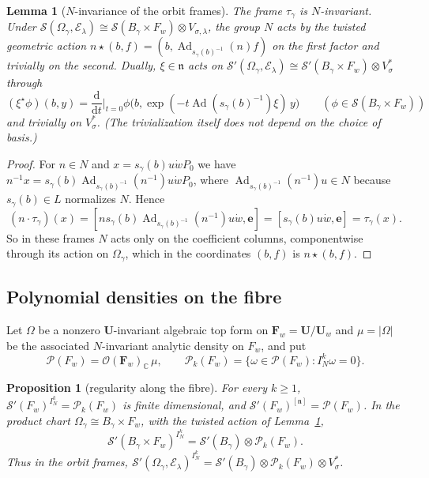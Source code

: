 \documentclass[a4paper,12pt]{amsart}
\numberwithin{equation}{section}
\newtheorem{proposition}[theorem]{Proposition}
\newtheorem{lemma}[theorem]{Lemma}
\theoremstyle{definition}
\theoremstyle{remark}
\newcommand{\U}{\mathbf U}
\newcommand{\F}{\mathbf F}
\newcommand{\C}{\mathbb C}
\newcommand{\fn}{\mathfrak n}
\newcommand{\IN}{I_N}
\newcommand{\mcS}{\mathcal S}
\newcommand{\mcE}{\mathcal E}
\newcommand{\mcP}{\mathcal P}
\newcommand{\Ad}{\operatorname{Ad}}
\newcommand{\dd}{\mathrm d}
\begin{document}
\begin{lemma}[$N$-invariance of the orbit frames]\label{lem:tau-invariant}
The frame $\tau_\gamma$ is $N$-invariant. Under $\mcS(\Omega_\gamma,\mcE_\lambda)\cong\mcS(B_\gamma\times F_w)\otimes V_{\sigma,\lambda}$, the group $N$ acts by the twisted geometric action $n\star(b,f)=(b,\Ad_{s_\gamma(b)^{-1}}(n)f)$ on the first factor and trivially on the second. Dually, $\xi\in\fn$ acts on $\mcS'(\Omega_\gamma,\mcE_\lambda)\cong\mcS'(B_\gamma\times F_w)\otimes V_\sigma^*$ through
\[
 (\xi^\star\phi)(b,y)=\frac{\dd}{\dd t}\Big|_{t=0}\phi\bigl(b,\exp(-t\Ad(s_\gamma(b)^{-1})\xi)\,y\bigr)\qquad(\phi\in\mcS(B_\gamma\times F_w))
\]
and trivially on $V_\sigma^*$. (The trivialization itself does not depend on the choice of basis.)
\end{lemma}

\begin{proof}
For $n\in N$ and $x=s_\gamma(b)u\dot wP_0$ we have $n^{-1}x=s_\gamma(b)\Ad_{s_\gamma(b)^{-1}}(n^{-1})u\dot wP_0$, where $\Ad_{s_\gamma(b)^{-1}}(n^{-1})u\in N$ because $s_\gamma(b)\in L$ normalizes $N$. Hence
\[
 (n\cdot\tau_\gamma)(x)=[ns_\gamma(b)\Ad_{s_\gamma(b)^{-1}}(n^{-1})u\dot w,\mathbf e]
 =[s_\gamma(b)u\dot w,\mathbf e]=\tau_\gamma(x).
\]
So in these frames $N$ acts only on the coefficient columns, componentwise through its action on $\Omega_\gamma$, which in the coordinates $(b,f)$ is $n\star(b,f)$.
\end{proof}

\subsection{Polynomial densities on the fibre}\label{ssec:poly-densities}

Let $\Omega$ be a nonzero $\U$-invariant algebraic top form on $\F_w=\U/\U_w$ and $\mu=|\Omega|$ be the associated $N$-invariant analytic density on $F_w$, and put
\[
 \mcP(F_w)=\mathcal O(\F_w)_\C\,\mu,\qquad\mcP_k(F_w)=\{\omega\in\mcP(F_w):\IN^k\omega=0\}.
\]

\begin{proposition}[regularity along the fibre]\label{prop:poly-densities}
For every $k\ge1$, $\mcS'(F_w)^{\IN^k}=\mcP_k(F_w)$ is finite dimensional,
and $\mcS'(F_w)^{[\fn]}=\mcP(F_w)$. In the product chart $\Omega_\gamma\cong B_\gamma\times F_w$, with the twisted action of Lemma~\ref{lem:tau-invariant},
\[
 \mcS'(B_\gamma\times F_w)^{\IN^k}=\mcS'(B_\gamma)\otimes\mcP_k(F_w).
\]
Thus in the orbit frames, $\mcS'(\Omega_\gamma,\mcE_\lambda)^{\IN^k}=\mcS'(B_\gamma)\otimes\mcP_k(F_w)\otimes V_\sigma^*$.
\end{proposition}
\end{document}
